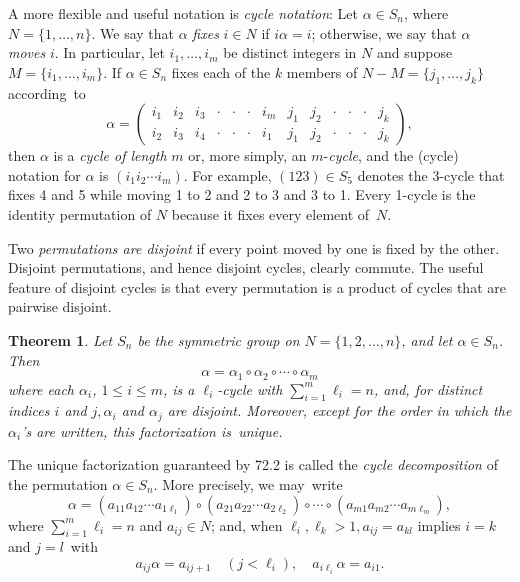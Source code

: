 \documentclass{surv-l}
\numberwithin{equation}{section}
\numberwithin{table}{section}
\numberwithin{figure}{section}
\newtheorem{theorem}[equation]{Theorem}
\theoremstyle{definition}
\begin{document}
A more flexible and useful notation is \emph{cycle notation}: Let
$\alpha\in S_{n}$, where $N=\{1,\ldots, n\}$. We say that $\alpha$
\emph{fixes} $i\in N$ if $i\alpha=i$; otherwise, we say that
$\alpha$ \emph{moves} $i$. In particular, let $i_{1},\ldots,
i_{m}$ be distinct integers in $N$ and suppose $M=\{i_{1},\ldots,
i_{m}\}$. If $\alpha\in S_{n}$ fixes each of the $k$ members of
$N-M=\{j_{1},\ldots, j_{k}\}$ according~to
\[
\alpha=\left(\begin{array}{ccccccccccccc}
i_{1} & i_{2} & i_{3} &\cdot &\cdot &\cdot & i_{m} & j_{1} & j_{2} &\cdot &\cdot &\cdot & j_{k}\\
i_{2} & i_{3} & i_{4} &\cdot &\cdot &\cdot & i_{1} & j_{1} & j_{2} &\cdot &\cdot &\cdot & j_{k}
\end{array}\right),
\]
then $\alpha$ is a \emph{cycle of length}
$m$ or, more simply, an $m$-\emph{cycle}, and the (cycle) notation
for $\alpha$ is $(i_{1}i_{2}\cdots i_{m})$. For example, $(123)
\in S_{5}$ denotes the 3-cycle that fixes 4 and 5 while moving 1
to 2 and 2 to 3 and 3 to 1. Every 1-cycle is the identity
permutation of $N$ because it fixes every element of~$N$.

Two \emph{permutations are disjoint} if every point moved by one is fixed by the other.
Disjoint permutations, and hence disjoint cycles, clearly commute.
The useful feature of disjoint cycles is that every permutation is
a product of cycles that are pairwise disjoint.

\begin{theorem}\label{thmA.72.2}
Let $S_{n}$ be the symmetric group on $N=\{1,2,\ldots, n\}$,
and let $\alpha\in S_{n}$. Then
\[
\alpha=\alpha_{1}\circ \alpha_{2}\circ \cdots \circ\alpha_{m}
\]
where each $\alpha_{i}$, $1\leq i\leq m$, is a $\ell_{i}$-cycle
with $\sum_{i=1}^{m}\ell_{i}=n$, and, for distinct indices $i$
and $j, \alpha_{i}$ and $\alpha_{j}$ are disjoint. Moreover,
except for the order in which the $\alpha_{i}$'s are written,
this factorization is~unique.
\end{theorem}

The unique factorization guaranteed by 72.2 is called the
\emph{cycle decomposition} of the permutation $\alpha\in S_{n}$.
More precisely, we may~write
\begin{equation}\label{eqA.72.3}
 \alpha=(a_{11}a_{12}\cdots a_{1\ell_{1}})\circ(a_{21}a_{22}\cdots a_{2\ell_{2}})\circ\cdots \circ (a_{m1}a_{m2}\cdots a_{m\ell_{m}}),
\end{equation}
where $\sum_{i=1}^{m}\ell_{i}=n$ and $a_{ij}\in N$; and, when
$\ell_{i}, \ell_{k}>1, a_{ij}=a_{kl}$ implies $i=k$ and
$j=l$~with
\[
a_{ij}\alpha=a_{ij+1}\quad (j<\ell_{i}),\quad a_{i\ell_{i}}\alpha=a_{i1}.
\]
\end{document}
